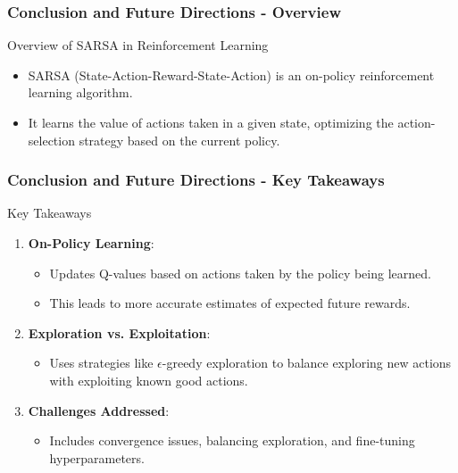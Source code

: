 \documentclass{beamer}
\begin{document}
\begin{frame}[fragile]
    \frametitle{Conclusion and Future Directions - Overview}
    \begin{block}{Overview of SARSA in Reinforcement Learning}
        \begin{itemize}
            \item SARSA (State-Action-Reward-State-Action) is an on-policy reinforcement learning algorithm.
            \item It learns the value of actions taken in a given state, optimizing the action-selection strategy based on the current policy.
        \end{itemize}
    \end{block}
\end{frame}

\begin{frame}[fragile]
    \frametitle{Conclusion and Future Directions - Key Takeaways}
    \begin{block}{Key Takeaways}
        \begin{enumerate}
            \item \textbf{On-Policy Learning}:
            \begin{itemize}
                \item Updates Q-values based on actions taken by the policy being learned.
                \item This leads to more accurate estimates of expected future rewards.
            \end{itemize}
            \item \textbf{Exploration vs. Exploitation}:
            \begin{itemize}
                \item Uses strategies like $\epsilon$-greedy exploration to balance exploring new actions with exploiting known good actions.
            \end{itemize}
            \item \textbf{Challenges Addressed}:
            \begin{itemize}
                \item Includes convergence issues, balancing exploration, and fine-tuning hyperparameters.
            \end{itemize}
        \end{enumerate}
    \end{block}
\end{frame}
\end{document}
